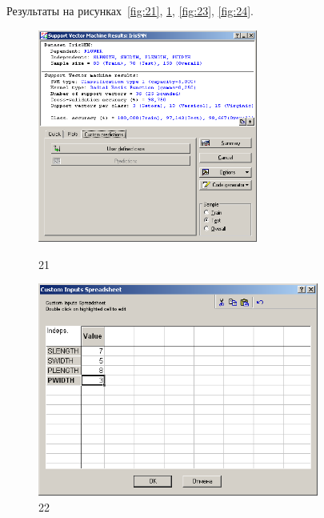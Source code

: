 Результаты на рисунках~\ref{fig:21}, \ref{fig:22}, \ref{fig:23}, \ref{fig:24}.

\begin{figure}[!h]
  \centering

  \begin{minipage}{0.49\textwidth}
    \centering

    \includegraphics[height=7cm]
    {inc/ex_21.PNG}

    \caption{21}

    \label{fig:21}
  \end{minipage}
  \begin{minipage}{0.49\textwidth}
    \centering

    \includegraphics[height=7cm]
    {inc/ex_22.PNG}

    \caption{22}

    \label{fig:22}
  \end{minipage}
\end{figure}

